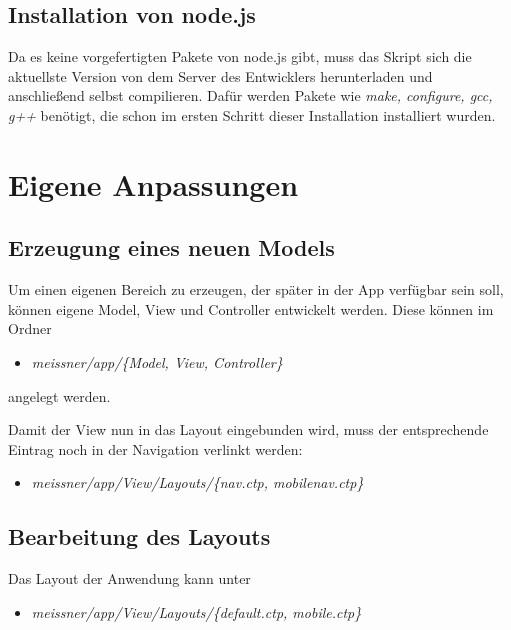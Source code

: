 
\newpage
\section{Installation von node.js}
Da es keine vorgefertigten Pakete von node.js gibt, muss das Skript sich die aktuellste Version von dem Server des Entwicklers herunterladen und anschließend selbst compilieren. Dafür werden Pakete wie \emph{make, configure, gcc, g++} benötigt, die schon im ersten Schritt dieser Installation installiert wurden. 


\chapter{Eigene Anpassungen}
\section{Erzeugung eines neuen Models}
Um einen eigenen Bereich zu erzeugen, der später in der App verfügbar sein soll, können eigene Model, View und Controller entwickelt werden. Diese können im Ordner

\begin{itemize}
	\item[] \emph{meissner/app/\{Model, View, Controller\}}
\end{itemize}

angelegt werden.\par

Damit der View nun in das Layout eingebunden wird, muss der entsprechende Eintrag noch in der Navigation verlinkt werden:

\begin{itemize}
	\item[] \emph{meissner/app/View/Layouts/\{nav.ctp, mobilenav.ctp\}}
\end{itemize}

\section{Bearbeitung des Layouts}
Das Layout der Anwendung kann unter 

\begin{itemize}
	\item[] \emph{meissner/app/View/Layouts/\{default.ctp, mobile.ctp\}}
\end{itemize}

